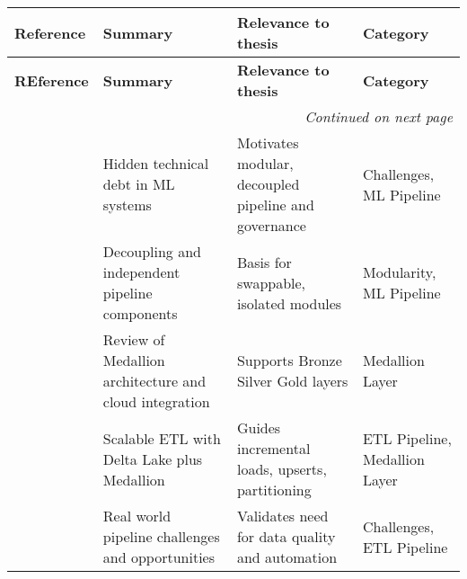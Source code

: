 \begin{longtable}{p{} p{} p{} p{}}
    \toprule
    \textbf{Reference} & \textbf{Summary}                                       & \textbf{Relevance to thesis} & \textbf{Category} \\
    \midrule
    \endfirsthead
    \toprule
    \textbf{REference} & \textbf{Summary}                                       & \textbf{Relevance to thesis} & \textbf{Category} \\
    \midrule
    \endhead
    \midrule
    \multicolumn{4}{r}{\emph{Continued on next page}}                                                                              \\
    \midrule
    \endfoot
    \bottomrule
    \endlastfoot

    \cite{sculley:2015}
                       & Hidden technical debt in ML systems
                       & Motivates modular, decoupled pipeline and governance
                       & Challenges, ML Pipeline                                                                                   \\

    \cite{modi:2023}
                       & Decoupling and independent pipeline components
                       & Basis for swappable, isolated modules
                       & Modularity, ML Pipeline                                                                                   \\

    \cite{mohna:2022}
                       & Review of Medallion architecture and cloud integration
                       & Supports Bronze Silver Gold layers
                       & Medallion Layer                                                                                           \\

    \cite{gujjala:2024}
                       & Scalable ETL with Delta Lake plus Medallion
                       & Guides incremental loads, upserts, partitioning
                       & ETL Pipeline, Medallion Layer                                                                             \\

    \cite{munappy:2020}
                       & Real world pipeline challenges and opportunities
                       & Validates need for data quality and automation
                       & Challenges, ETL Pipeline                                                                                  \\



\end{longtable}

